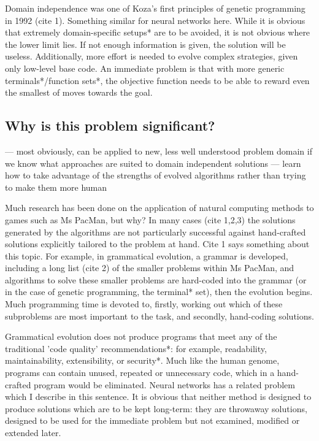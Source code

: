 \documentclass[a4paper,12pt]{article}
\begin{document}
Domain independence was one of Koza's first principles of genetic programming in 1992 (cite 1).  Something similar for neural networks here.  While it is obvious that extremely domain-specific setups* are to be avoided, it is not obvious where the lower limit lies. If not enough information is given, the solution will be useless. Additionally, more effort is needed to evolve complex strategies, given only low-level base code. An immediate problem is that with more generic terminals*/function sets*, the objective function needs to be able to reward even the smallest of moves towards the goal. 

\subsection*{Why is this problem significant?}

--- most obviously, can be applied to new, less well understood problem domain if we know what approaches are suited to domain independent solutions
--- learn how to take advantage of the strengths of evolved algorithms rather than trying to make them more human

Much research has been done on the application of natural computing methods to games such as Ms PacMan, but why? In many cases (cite 1,2,3) the solutions generated by the algorithms are not particularly successful against hand-crafted solutions explicitly tailored to the problem at hand. Cite 1 says something about this topic.  For example, in grammatical evolution, a grammar is developed, including a long list (cite 2) of the smaller problems within Ms PacMan, and algorithms to solve these smaller problems are hard-coded into the grammar (or in the case of genetic programming, the terminal* set), then the evolution begins.  Much programming time is devoted to, firstly, working out which of these subproblems are most important to the task, and secondly, hand-coding solutions.

Grammatical evolution does not produce programs that meet any of the traditional 'code quality' recommendations*: for example, readability, maintainability, extensibility, or security*. Much like the human genome, programs can contain unused, repeated or unnecessary code, which in a hand-crafted program would be eliminated. Neural networks has a related problem which I describe in this sentence. It is obvious that neither method is designed to produce solutions which are to be kept long-term: they are throwaway solutions, designed to be used for the immediate problem but not examined, modified or extended later.
\end{document}
